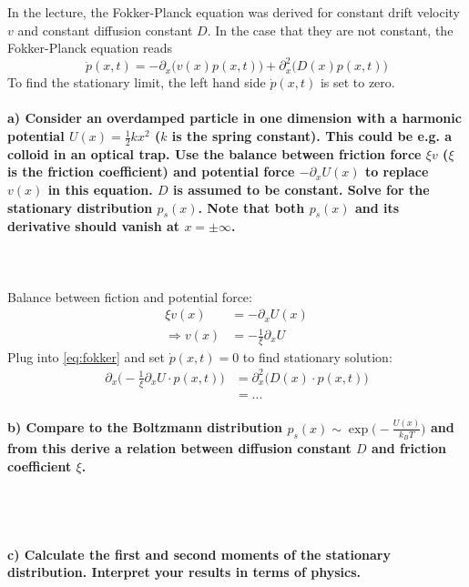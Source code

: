 In the lecture, the Fokker-Planck equation was derived for constant 
drift velocity $v$ and constant diffusion constant $D$. In the case 
that they are not constant, the Fokker-Planck equation reads
\begin{equation}
    \dot{p}(x,t)=-\partial_x\bigg(v(x)p(x,t)\bigg)+
    \partial_x^2\bigg(D(x)p(x,t)\bigg)
    \label{eq:fokker}
\end{equation}
To find the stationary limit, the left hand side $\dot p(x,t)$ is set 
to zero.

\paragraph{a) Consider an overdamped particle in one dimension with a 
    harmonic potential $U(x)=\frac{1}{2}kx^2$ ($k$ is the spring 
    constant). This could be e.g. a colloid in an optical trap. Use the 
    balance between friction force $\xi v$ ($\xi$ is the friction
    coefficient) and potential force $-\partial_xU(x)$ to replace 
    $v(x)$ in this equation. $D$ is assumed to be constant. Solve for 
    the stationary distribution $p_s(x)$. Note that both $p_s(x)$ and 
    its derivative should vanish at $x=\pm\infty$.
} \ \\
\\
    Balance between fiction and potential force:
    \begin{align}
        \xi v(x)
        &=-\partial_x U(x) \\
        \Rightarrow v(x)&=-\frac{1}{\xi}\partial_x U
    \end{align}
    Plug into \autoref{eq:fokker} and set $\dot p(x,t)=0$ to find 
    stationary solution:
    \begin{align}
        \partial_x\bigg(-\frac{1}{\xi}\partial_x U\cdot p(x,t)\bigg)
        &=\partial_x^2\bigg(D(x)\cdot p(x,t)\bigg) \\
        &=...
    \end{align}

\paragraph{b) Compare to the Boltzmann distribution 
    $p_s(x)\sim\exp\bigg(-\frac{U(x)}{k_BT}\bigg)$ and from this derive a 
    relation between diffusion constant $D$ and friction coefficient $\xi$.
} \ \\
\\

\paragraph{c) Calculate the first and second moments of the stationary
    distribution. Interpret your results in terms of physics.
} \ \\
\\


